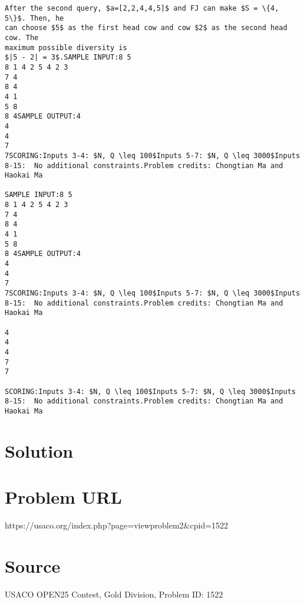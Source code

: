 \documentclass[12pt]{article}
\begin{document}
\begin{verbatim}
After the second query, $a=[2,2,4,4,5]$ and FJ can make $S = \{4, 5\}$. Then, he
can choose $5$ as the first head cow and cow $2$ as the second head cow. The
maximum possible diversity is
$|5 - 2| = 3$.SAMPLE INPUT:8 5
8 1 4 2 5 4 2 3
7 4
8 4
4 1
5 8
8 4SAMPLE OUTPUT:4
4
4
7
7SCORING:Inputs 3-4: $N, Q \leq 100$Inputs 5-7: $N, Q \leq 3000$Inputs 8-15:  No additional constraints.Problem credits: Chongtian Ma and Haokai Ma

SAMPLE INPUT:8 5
8 1 4 2 5 4 2 3
7 4
8 4
4 1
5 8
8 4SAMPLE OUTPUT:4
4
4
7
7SCORING:Inputs 3-4: $N, Q \leq 100$Inputs 5-7: $N, Q \leq 3000$Inputs 8-15:  No additional constraints.Problem credits: Chongtian Ma and Haokai Ma

4
4
4
7
7

SCORING:Inputs 3-4: $N, Q \leq 100$Inputs 5-7: $N, Q \leq 3000$Inputs 8-15:  No additional constraints.Problem credits: Chongtian Ma and Haokai Ma
\end{verbatim}

\section*{Solution}


\section*{Problem URL}
https://usaco.org/index.php?page=viewproblem2&cpid=1522

\section*{Source}
USACO OPEN25 Contest, Gold Division, Problem ID: 1522
\end{document}
